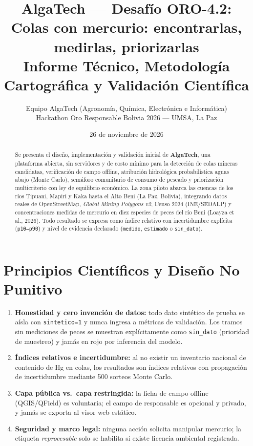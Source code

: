 \documentclass[11pt,a4paper]{article}
\title{\textbf{AlgaTech — Desafío ORO-4.2: Colas con mercurio: encontrarlas, medirlas, priorizarlas}\\[0.4em]
\large Informe Técnico, Metodología Cartográfica y Validación Científica}
\author{Equipo AlgaTech (Agronomía, Química, Electrónica e Informática)\\
Hackathon Oro Responsable Bolivia 2026 — UMSA, La Paz}
\date{26 de noviembre de 2026}
\begin{document}
\maketitle

\begin{abstract}
Se presenta el diseño, implementación y validación inicial de \textbf{AlgaTech}, una plataforma abierta, sin servidores y de costo mínimo para la detección de colas mineras candidatas, verificación de campo offline, atribución hidrológica probabilística aguas abajo (Monte Carlo), semáforo comunitario de consumo de pescado y priorización multicriterio con ley de equilibrio económico. La zona piloto abarca las cuencas de los ríos Tipuani, Mapiri y Kaka hasta el Alto Beni (La Paz, Bolivia), integrando datos reales de OpenStreetMap, \textit{Global Mining Polygons v2}, Censo 2024 (INE/SEDALP) y concentraciones medidas de mercurio en diez especies de peces del río Beni (Loayza et al., 2026). Todo resultado se expresa como índice relativo con incertidumbre explícita (\texttt{p10--p90}) y nivel de evidencia declarado (\texttt{medido}, \texttt{estimado} o \texttt{sin\_dato}).
\end{abstract}

\section{Principios Científicos y Diseño No Punitivo}
\begin{enumerate}
  \item \textbf{Honestidad y cero invención de datos:} todo dato sintético de prueba se aísla con \texttt{sintetico=1} y nunca ingresa a métricas de validación. Los tramos sin mediciones de peces se muestran explícitamente como \texttt{sin\_dato} (prioridad de muestreo) y jamás en rojo por inferencia del modelo.
  \item \textbf{Índices relativos e incertidumbre:} al no existir un inventario nacional de contenido de Hg en colas, los resultados son índices relativos con propagación de incertidumbre mediante 500 sorteos Monte Carlo.
  \item \textbf{Capa pública vs.\ capa restringida:} la ficha de campo offline (QGIS/QField) es voluntaria; el campo de responsable es opcional y privado, y jamás se exporta al visor web estático.
  \item \textbf{Seguridad y marco legal:} ninguna acción solicita manipular mercurio; la etiqueta \textit{reprocesable} solo se habilita si existe licencia ambiental registrada.
\end{enumerate}
\end{document}
